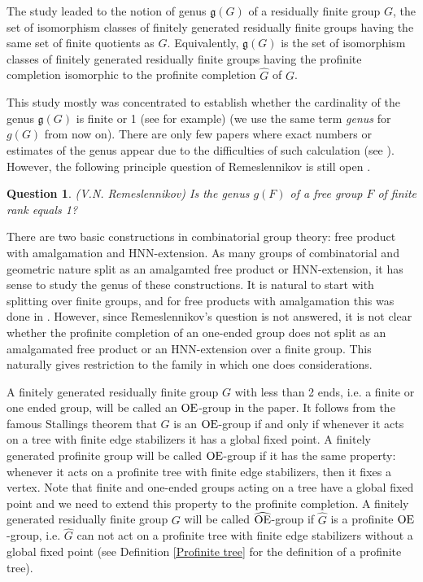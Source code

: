 \documentclass[a4paper,12pt]{article}
\newtheorem{question}{Question}
\newcommand{\Oe}{\rm \widehat{OE}}
\def\OE{{\rm OE}}
\begin{document}
		The study leaded to the notion of genus $\mathfrak{g}(G)$ of a residually finite group $G$, the set of isomorphism classes of finitely generated residually finite groups having the same set of finite quotients as $G$. Equivalently, $\mathfrak{g}(G)$ is the set of isomorphism classes of finitely generated residually finite groups having the  profinite completion isomorphic to the profinite completion $\widehat G$ of $G$. 
		
		This study mostly was concentrated to establish whether the cardinality of  the  genus $\mathfrak{g}(G)$ is finite or  1 (see  \cite{Aka, BCR16, BMRS18, BMRS20, BPZ2, BPZ, BZ, Dav, GPS, GS, GZ, J, J2, J3, M, Sam, Sam2, Wil17} for example) (we use the same term {\it genus} for $g(G)$ from now on). There are only few papers where exact numbers or estimates of the genus appear due to the difficulties of such calculation (see \cite{BPZ2, BPZ, BZ, GZ, Ner19, Ner20, Ner24}).
However, the following principle question of Remeslennikov is still open \cite[Question 5.48]{K}.
		
		\begin{question} (V.N. Remeslennikov)
		Is the genus $g(F)$ of a free group $F$ of finite rank equals 1?
		
		\end{question}

There are two basic constructions in combinatorial group theory: free product with amalgamation and HNN-extension. As many groups of combinatorial and geometric nature split as an amalgamted free product or HNN-extension, it has sense  to study the genus of these constructions.  It is natural to start with splitting over finite groups, and for free products with amalgamation this was done in \cite{BPZ}.  However, since Remeslennikov's question is not answered, it is not clear whether the profinite completion of an one-ended group does not split as an amalgamated free product or an HNN-extension over a finite group. This naturally gives restriction to the family in which one does considerations.



A finitely generated residually finite group $G$ with less than 2 ends, i.e. a finite or one ended group, will be called an $\OE$-group in the paper.   It follows from the famous Stallings theorem that $G$ is an $\OE$-group  if and only if whenever it acts on a tree with finite edge stabilizers
it  has a global fixed point. A finitely generated profinite group will be called $\OE$-group if it has the same property:   whenever it acts   on a  profinite tree  with finite edge stabilizers, then it fixes a vertex.  Note that  finite and one-ended groups acting on a tree have a global fixed point and we need to extend this property to the profinite completion.  A finitely generated residually finite group $G$ will be called $\Oe$-group if  $\widehat G$  is a profinite $\OE$-group, i.e. $\widehat G$  can not act on a profinite tree with finite edge stabilizers without a global fixed point (see Definition \ref{Profinite tree} for the definition of a profinite tree). 
\end{document}
